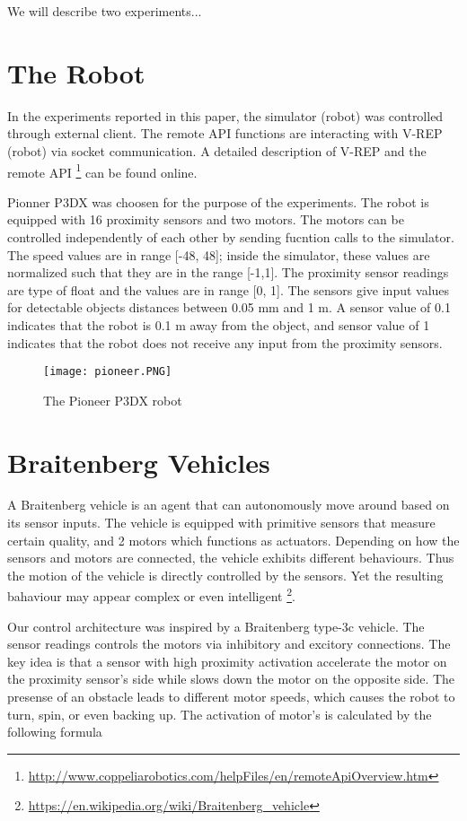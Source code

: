\documentclass[format=acmsmall, review=false, screen=true]{acmart}
\begin{document}
We will describe two experiments...


\section{The Robot}

In the experiments reported in this paper, the simulator (robot) was controlled through external client. The remote API functions are interacting with V-REP (robot) via socket communication. A detailed description of V-REP and the remote API \footnote{\url{http://www.coppeliarobotics.com/helpFiles/en/remoteApiOverview.htm}} can be found online.

Pionner P3DX was choosen for the purpose of the experiments. The robot is equipped with 16 proximity sensors and two motors. The motors can be controlled independently of each other by sending fucntion calls to the simulator. The speed values are in range [-48, 48]; inside the simulator, these values are normalized such that they are in the range [-1,1]. The proximity sensor readings are type of float and the values are in range [0, 1]. The sensors give input values for detectable objects distances between 0.05 mm and 1 m. A sensor value of 0.1 indicates that the robot is 0.1 m away from the object, and sensor value of 1 indicates that the robot does not receive any input from the proximity sensors.

\begin{figure}[H]
  \texttt{[image: pioneer.PNG]}
  \caption{The Pioneer P3DX robot}
  \label{fig:pioneer-robot}
\end{figure}

\section{Braitenberg Vehicles}

A Braitenberg vehicle is an agent that can autonomously move around based on its sensor inputs. The vehicle is equipped with primitive sensors that measure certain quality, and 2 motors which functions as actuators. Depending on how the sensors and motors are connected, the vehicle exhibits different behaviours. Thus the motion of the vehicle is directly controlled by the sensors. Yet the resulting bahaviour may appear complex or even intelligent \footnote{\url{https://en.wikipedia.org/wiki/Braitenberg_vehicle}}.

Our control architecture was inspired by a Braitenberg type-3c vehicle. The sensor readings controls the motors via inhibitory and excitory connections. The key idea is that a sensor with high proximity activation accelerate the motor on the proximity sensor's side while slows down the motor on the opposite side. The presense of an obstacle leads to different motor speeds, which causes the robot to turn, spin, or even backing up. The activation of motor's is calculated by the following formula
\end{document}
